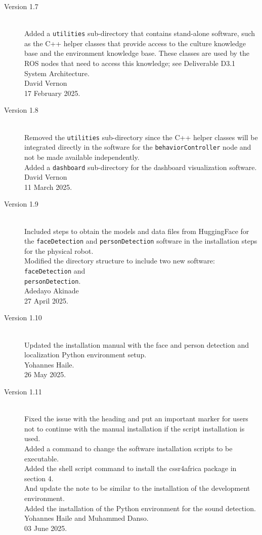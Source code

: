 \documentclass{CSSRforAfrica}
\begin{document}
{\begin{description}
			\item [Version 1.7]~\\
			Added a {\small \tt utilities} sub-directory that contains stand-alone software, such as the C++ helper classes that provide access to the culture knowledge base and the environment knowledge base. These classes are used by the ROS nodes that need to access this knowledge; see Deliverable D3.1 System Architecture.\\
			David Vernon \\       
			17 February 2025.
			
			\item [Version 1.8]~\\
			Removed the {\small \tt utilities} sub-directory since the C++ helper classes will be integrated directly in the software for the {\small \tt behaviorController} node and not be made available independently.\\
			Added a  {\small \tt dashboard} sub-directory for the dashboard visualization software.\\
			David Vernon \\       
			11 March 2025.
			
			\item [Version 1.9]~\\
			Included steps to obtain the models and data files from HuggingFace for the \texttt{faceDetection} and \texttt{personDetection} software in the installation steps for the physical robot.\\
			Modified the directory structure to include two new software: \texttt{faceDetection} and \\ \texttt{personDetection}.\\
			Adedayo Akinade \\       
			27 April 2025.
			
			\item [Version 1.10]~\\
			Updated the installation manual with the face and person detection and localization Python environment setup.\\
			Yohannes Haile.\\    
			26 May 2025.
			
			\item [Version 1.11]~\\
			Fixed the issue with the heading and put an important marker for users not to continue with the manual installation if the script installation is used. \\
			Added a command to change the software installation scripts to be executable.\\
			Added the shell script command to install the cssr4africa package in section 4.\\
			And update the note to be similar to the installation of the development environment. \\
			Added the installation of the Python environment for the sound detection. \\
			Yohannes Haile and Muhammed Danso.\\
			03 June 2025.
			

\end{description}}
\end{document}
